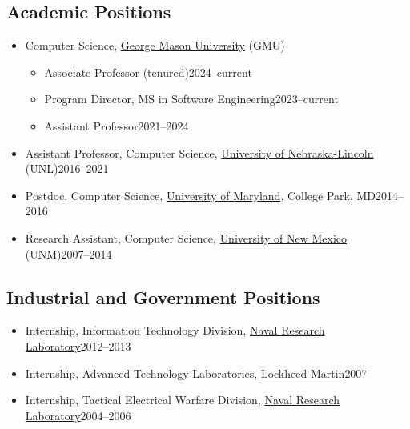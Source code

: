 \documentclass[11pt]{article}
\begin{document}
    \subsection{Academic Positions}

    \begin{itemize}
      \item Computer Science, \href{https://cs.gmu.edu}{George Mason University} (GMU)
            \begin{itemize}
              \item Associate Professor (tenured)\hfill 2024--current
              \item Program Director, MS in Software Engineering\hfill 2023--current
              \item Assistant Professor\hfill 2021--2024

            \end{itemize}

      \item Assistant Professor, Computer Science, \href{https://computing.unl.edu}{University of Nebraska-Lincoln} (UNL)\hfill 2016--2021

      \item Postdoc, Computer Science,  \href{https://www.umd.edu}{University of Maryland}, College Park, MD\hfill 2014--2016

      \item Research Assistant, Computer Science, \href{https://www.cs.unm.edu}{University of New Mexico} (UNM)\hfill 2007--2014

    \end{itemize}

    \subsection{Industrial and Government Positions}
    \begin{itemize}
      \item Internship, Information Technology Division, \href{https://www.nrl.navy.mil}{Naval Research Laboratory}\hfill 2012--2013
      \item Internship, Advanced Technology Laboratories, \href{https://lockheedmartin.com/en-us/capabilities/research-labs/advanced-technology-labs.html}{Lockheed Martin}\hfill 2007
      \item Internship, Tactical Electrical Warfare Division,  \href{https://www.nrl.navy.mil}{Naval Research Laboratory}\hfill 2004--2006
    \end{itemize}
\end{document}
